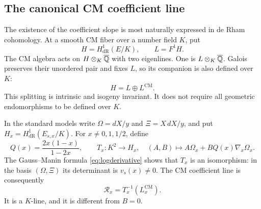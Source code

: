 \subsection{The canonical CM coefficient line}
\label{sec:cm-existence-certificates}

The existence of the coefficient slope is most naturally expressed
in de Rham cohomology.  At a smooth CM fiber over a number field
$K$, put
\[
 H=H^1_{\mathrm{dR}}(E/K),\qquad L=F^1H.
\]
The CM algebra acts on $H\otimes_K\overline{\mathbb Q}$ with two eigenlines.
One is $L\otimes_K\overline{\mathbb Q}$.  Galois preserves their unordered pair
and fixes $L$, so its companion is also defined over $K$:
\begin{equation}\label{eq:cm-canonical-splitting}
                             H=L\oplus L^{\mathrm{CM}}.
\end{equation}
This splitting is intrinsic and isogeny invariant.  It does not
require all geometric endomorphisms to be defined over $K$.

In the standard models write $\Omega=dX/y$ and $\Xi=X\,dX/y$,
and put $H_x=H^1_{\mathrm{dR}}(E_{s,x}/K)$.  For
$x\ne0,1,1/2$, define
\[
 Q(x)=\frac{2x(1-x)}{1-2x},\qquad
 T_x:K^2\longrightarrow H_x,\quad
 (A,B)\longmapsto A\Omega_x+BQ(x)\nabla_x\Omega_x.
\]
The Gauss--Manin formula \eqref{eq:logderivative} shows that
$T_x$ is an isomorphism: in the basis $(\Omega,\Xi)$ its determinant
is $v_s(x)\ne0$.  The CM coefficient line is consequently
\begin{equation}\label{eq:cm-coefficient-line}
                       \mathcal R_x=T_x^{-1}(L_x^{\mathrm{CM}}).
\end{equation}
It is a $K$-line, and it is different from $B=0$.

